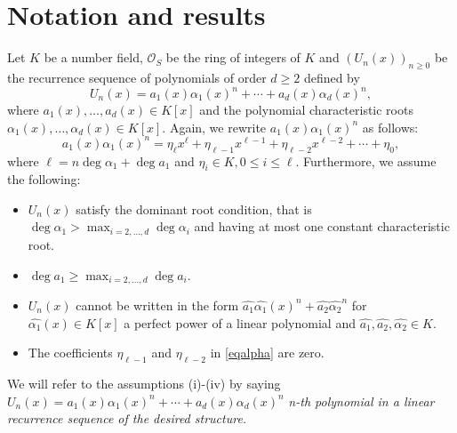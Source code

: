 \documentclass[12pt]{amsart}
\begin{document}
	\section{Notation and results} \label{sec:notation}
	Let $K$ be a number field, $\mathcal{O}_S$ be the ring of integers of $K$ and $(U_n(x))_{n\geq 0}$ be the recurrence sequence of polynomials of order $d\geq2$ defined by
	\begin{equation}\label{maineq}
	U_n(x)=a_1(x)\alpha_1(x)^n+\cdots+a_d(x)\alpha_d(x)^n,
	\end{equation}
	where $a_1(x),\ldots,a_d(x)\in K[x]$ and the polynomial characteristic roots $\alpha_1(x),\ldots,\alpha_d(x)\in K[x]$. Again, we rewrite $a_1(x)\alpha_1(x)^n$ as follows:
    \begin{equation}\label{eqalpha}
        a_1(x)\alpha_1(x)^n=\eta_{\ell}x^{\ell}+\eta_{\ell-1}x^{\ell-1}+\eta_{\ell-2}x^{\ell-2}+\cdots+\eta_{0},
    \end{equation} where $\ell=n\deg \alpha_1+\deg a_1$ and $\eta_i\in K, 0\leq i\leq \ell$. Furthermore, we assume the following:
    \begin{itemize}
        \item[(i)] $U_n(x)$ satisfy the dominant root condition, that is $\deg \alpha_1>\max_{i=2,\ldots,d}\deg \alpha_i$ and having at most one constant characteristic root.
        \item[(ii)] $\deg a_1\geq \max_{i=2,\ldots,d}\deg a_i$.
        \item[(iii)] $U_n(x)$ cannot be written in the form $\hat{a_1}\hat{\alpha_1}(x)^n+\hat{a_2}\hat{\alpha_2}^n$ for $\hat{\alpha_1}(x)\in K[x]$ a perfect power of a linear polynomial and $\hat{a_1}, \hat{a_2},\hat{\alpha_2}\in K$.
        \item[(iv)] The coefficients $\eta_{\ell-1}$ and $\eta_{\ell-2}$ in \eqref{eqalpha} are zero.
    \end{itemize}
     We will refer to the assumptions (i)-(iv) by saying $	U_n(x)=a_1(x)\alpha_1(x)^n+\cdots+a_d(x)\alpha_d(x)^n$ {\it n-th polynomial in a linear recurrence sequence of the desired structure.}
\end{document}
